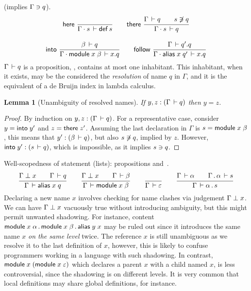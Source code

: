 \documentclass{article}
\theoremstyle{definition}
\theoremstyle{plain}
\newtheorem{lemma}{Lemma}
\theoremstyle{remark}
\begin{document}
 (implies $\Gamma\ni q$).
\begin{gather*}
  \nru{\rhere
     }{
     }{\Declares {\Gamma \chop s} {\defined s}}
\qquad
   \nru{\rthere
      }{\Declares \Gamma q \qquad \NotContains s q
      }{\Declares {\Gamma \chop s} q}
\\[2ex]
  \nru{\rinto
     }{\Declares \beta q
     }{\Declares {\Gamma \chop \mdef x \beta} {x.q}}
\qquad
  \nru{\rfollow
     }{\Declares \Gamma {q'.q}
     }{\Declares {\Gamma \chop \malias x q'} {x.q}}
\end{gather*}
$\Gamma\,\vdash q$ is a proposition, \ie, contains at most one
inhabitant.  This inhabitant, when it exists, may be the considered
the \emph{resolution} of name $q$ in $\Gamma$, and it is the
equivalent of a de Bruijn index in lambda calculus.
\begin{lemma}[Unambiguity of resolved names]
  If $y,z : (\Gamma\,\vdash q)$ then $y = z$.
\end{lemma}
\begin{proof}
  By induction on $y,z : (\Gamma\,\vdash q)$.
  For a representative case, consider
  $y = \mathsf{into}\;y'$ and $z = \mathsf{there}\;z'$.
  Assuming the last declaration in $\Gamma$ is $s = \mathsf{module}\;x\;\beta$,
  this means that $y' : (\beta\,\vdash q)$,
  but also $s\not\owns q$, implied by $z$.  However,
  $\mathsf{into}\;y' : (s\,\vdash q)$, which is impossible, as it implies
  $s\ni q$.
\end{proof}

Well-scopedness of statement (lists): propositions
  and
\fbox{$\WContent \Gamma \alpha$}\,.
\begin{gather*}
  \ru{\NoClash \Gamma x \qquad \Declares \Gamma q
    }{\WContent \Gamma {\malias x q}}
\qquad
  \ru{\NoClash \Gamma x \qquad \WContent \Gamma \beta
    }{\WContent \Gamma {\mdef x \beta}
    }
\qquad
  \ru{}{\WContent \Gamma \Ge}
\qquad
  \ru{\WContent \Gamma \alpha \qquad
      \WContent {\Gamma \sep \alpha} s
    }{\WContent \Gamma {\alpha \sep s}
    }
\end{gather*}
Declaring a new name $x$ involves checking for name clashes via judgement
$\Gamma \perp x$.  We can have $\Gamma \perp x$ vacuously true
without introducing ambiguity, but this might permit unwanted
shadowing.
For instance, content $\mathsf{module}\;x\;\alpha \,.\, \mathsf{module}\;x\;\beta \,.\, \mathsf{alias}\;y\;x$ may be ruled out
since it introduces the same name $x$ \emph{on the same level} twice.
The reference $x$ is still unambiguous as we resolve it to the last
definition of $x$, however, this is likely to confuse programmers
working in a language with such shadowing.
In contrast, $\mathsf{module}\;x\;(\mathsf{module}\;x\;\varepsilon)$ which declares a
parent $x$ with a child named $x$, is less controversial, since the
shadowing is on different levels.  It is very common that local
definitions may share global definitions, for instance.
\end{document}
